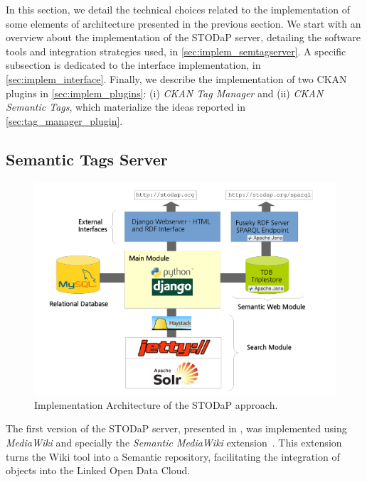 In this section, we detail the technical choices related to the implementation of some elements of architecture presented in the previous section.
We start with an overview about the implementation of the STODaP server, detailing the software tools and integration strategies used, in \autoref{sec:implem_semtagserver}.
A specific subsection is dedicated to the interface implementation, in \autoref{sec:implem_interface}.
Finally, we describe the implementation of two CKAN plugins in \autoref{sec:implem_plugins}:
(i) \emph{CKAN Tag Manager} and 
(ii) \emph{CKAN Semantic Tags}, which materialize the ideas reported in \autoref{sec:tag_manager_plugin}.

\subsection{Semantic Tags Server}
\label{sec:implem_semtagserver}

\begin{figure}[hb]
\begin{center}
\includegraphics[width=\columnwidth]{images/implementation_architecture.pdf}
\caption[Implementation Architecture of the STODaP approach.]{Implementation Architecture of the STODaP approach.}
\label{fig:implem_arch}
\end{center}
\end{figure}

The first version of the STODaP server, presented in , was implemented using \emph{MediaWiki} and specially the \emph{Semantic MediaWiki} extension~\cite{Kroetzsch2007}.
This extension turns the Wiki tool into a Semantic repository, facilitating the integration of objects into the Linked Open Data Cloud.

